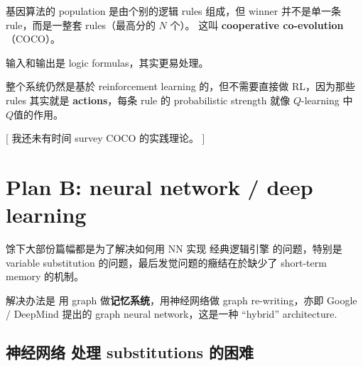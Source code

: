 \documentclass[12pt, orivec]{article}
\begin{document}

基因算法的 population 是由个别的逻辑 rules 组成，但 winner 并不是单一条 rule，而是一整套 rules（最高分的 $N$ 个）。 这叫 \textbf{cooperative co-evolution}（COCO）。  

输入和输出是 logic formulas，其实更易处理。 

整个系统仍然是基於 reinforcement learning 的，但不需要直接做 RL，因为那些 rules 其实就是 \textbf{actions}，每条 rule  的 probabilistic strength 就像 $Q$-learning 中 $Q$值的作用。 

[ 我还未有时间 survey COCO 的实践理论。 ]

\section{Plan B: neural network / deep learning}

馀下大部份篇幅都是为了解决如何用 NN 实现 经典逻辑引擎 的问题，特别是 variable substitution 的问题，最后发觉问题的癥结在於缺少了 short-term memory 的机制。

解决办法是 用 graph 做\textbf{记忆系统}，用神经网络做 graph re-writing，亦即 Google / DeepMind 提出的 graph neural network，这是一种 ``hybrid'' architecture.

\subsection{神经网络 处理 substitutions 的困难}
\label{NN}
\end{document}

